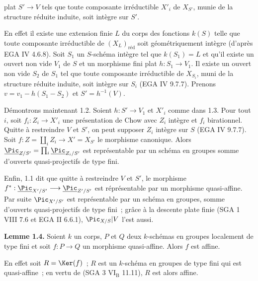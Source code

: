 plat \(S'\to V\) tels que toute composante irréductible \(X'_i\) de \(X_{S'}\), munie de la structure réduite induite, soit intègre sur \(S'\).

En effet il existe une extension finie \(L\) du corps des fonctions \(k(S)\) telle que toute composante irréductible de \((X_L)_{\text{réd}}\) soit géométriquement intègre (d'après EGA IV 4.6.8). Soit \(S_1\) un \(S\)-schéma intègre tel que \(k(S_1)=L\) et qu'il existe un ouvert non vide \(V_1\) de \(S\) et un morphisme fini plat \(h:S_1\to V_1\). Il existe un ouvert non vide \(S_2\) de \(S_1\) tel que toute composante irréductible de \(X_{S_i}\), muni de la structure réduite induite, soit intègre sur \(S_i\) (EGA IV 9.7.7). Prenons \(v=v_1-h(S_1-S_2)\) et \(S'=h^{-1}(V)\).

Démontrons maintenant 1.2. Soient \(h:S'\to V_1\) et \(X'_i\) comme dans 1.3. Pour tout \(i\), soit \(f_i:Z_i\to X'_i\) une présentation de Chow avec \(Z_i\) intègre et \(f_i\) birationnel. Quitte à restreindre \(V\) et \(S'\), on peut supposer \(Z_i\) intègre sur \(S\) (EGA IV 9.7.7). Soit \(f:Z=\coprod_i Z_i\longrightarrow X'=X_{S'}\) le morphisme canonique. Alors \(\underline{\Pic}_{Z/S'}=\prod_i\underline{\Pic}_{Z_i/S'}\) est représentable par un schéma en groupes somme d'ouverts quasi-projectifs de type fini.

Enfin, 1.1 dit que quitte à restreindre \(V\) et \(S'\), le morphisme \(f^*:\underline{\Pic}_{X'/S'}\longrightarrow \underline{\Pic}_{Z'/S'}\) est réprésentable par un morphisme quasi-affine. Par suite \(\Pic_{X'/S'}\) est représentable par un schéma en groupes, somme d'ouverts quasi-projectifs de type fini~; grâce à la descente plate finie (SGA 1 VIII 7.6 et EGA II 6.6.1), \(\Pic_{X/S}|V\) l'est aussi.

\textbf{Lemme 1.4.} Soient \(k\) un corps, \(P\) et \(Q\) deux \(k\)-schémas en groupes localement de type fini et soit \(f:P\to Q\) un morphisme quasi-affine. Alors \(f\) est affine.

En effet soit \(R=\Ker(f)\)~; \(R\) est un \(k\)-schéma en groupes de type fini qui est quasi-affine~; en vertu de (SGA 3 \(\mathrm{VI}_{\mathrm B}\) 11.11), \(R\) est alors affine.
